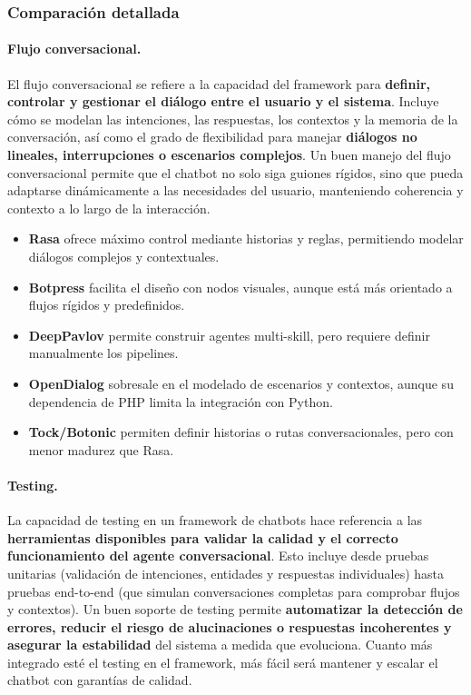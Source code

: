 \subsubsection{Comparación detallada}

\paragraph{Flujo conversacional.}

El flujo conversacional se refiere a la capacidad del framework para \textbf{definir, controlar y gestionar el diálogo entre el usuario y el sistema}. Incluye cómo se modelan las intenciones, las respuestas, los contextos y la memoria de la conversación, así como el grado de flexibilidad para manejar \textbf{diálogos no lineales, interrupciones o escenarios complejos}. Un buen manejo del flujo conversacional permite que el chatbot no solo siga guiones rígidos, sino que pueda adaptarse dinámicamente a las necesidades del usuario, manteniendo coherencia y contexto a lo largo de la interacción.

\begin{itemize}
    \item \textbf{Rasa} ofrece máximo control mediante historias y reglas, permitiendo modelar diálogos complejos y contextuales.
    \item \textbf{Botpress} facilita el diseño con nodos visuales, aunque está más orientado a flujos rígidos y predefinidos.
    \item \textbf{DeepPavlov} permite construir agentes multi-skill, pero requiere definir manualmente los pipelines.
    \item \textbf{OpenDialog} sobresale en el modelado de escenarios y contextos, aunque su dependencia de PHP limita la integración con Python.
    \item \textbf{Tock/Botonic} permiten definir historias o rutas conversacionales, pero con menor madurez que Rasa.
\end{itemize}

\paragraph{Testing.}

La capacidad de testing en un framework de chatbots hace referencia a las \textbf{herramientas disponibles para validar la calidad y el correcto funcionamiento del agente conversacional}. Esto incluye desde pruebas unitarias (validación de intenciones, entidades y respuestas individuales) hasta pruebas end-to-end (que simulan conversaciones completas para comprobar flujos y contextos). Un buen soporte de testing permite \textbf{automatizar la detección de errores, reducir el riesgo de alucinaciones o respuestas incoherentes y asegurar la estabilidad} del sistema a medida que evoluciona. Cuanto más integrado esté el testing en el framework, más fácil será mantener y escalar el chatbot con garantías de calidad.

